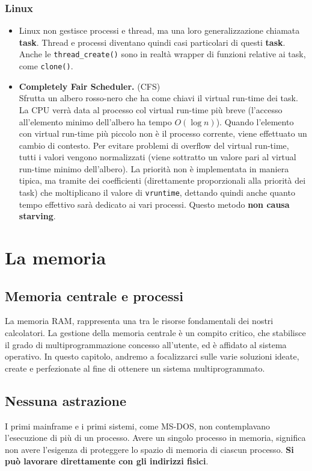 \documentclass{report}
\begin{document}
\subsection{Linux}
\begin{itemize}
    \item Linux non gestisce processi e thread, ma una loro generalizzazione chiamata \textbf{task}. Thread e processi diventano quindi casi particolari di questi \textbf{task}. Anche le \verb|thread_create()| sono in realtà wrapper di funzioni relative ai task, come \verb|clone()|.
    
    \item \textbf{Completely Fair Scheduler.} (CFS)\\
    Sfrutta un albero rosso-nero che ha come chiavi il virtual run-time dei task. La CPU verrà data al processo col virtual run-time più breve (l'accesso all'elemento minimo dell'albero ha tempo $O(\log n)$). Quando l'elemento con virtual run-time più piccolo non è il processo corrente, viene effettuato un cambio di contesto. Per evitare problemi di overflow del virtual run-time, tutti i valori vengono normalizzati (viene sottratto un valore pari al virtual run-time minimo dell'albero).
    La priorità non è implementata in maniera tipica, ma tramite dei coefficienti (direttamente proporzionali alla priorità dei task) che moltiplicano il valore di \verb|vruntime|, dettando quindi anche quanto tempo effettivo sarà dedicato ai vari processi. Questo metodo \textbf{non causa starving}.
\end{itemize}

\chapter{La memoria}

\section{Memoria centrale e processi}
La memoria RAM, rappresenta una tra le risorse fondamentali dei nostri calcolatori. La gestione della memoria centrale è un compito critico, che stabilisce il grado di multiprogrammazione concesso all'utente, ed è affidato al sistema operativo.
In questo capitolo, andremo a focalizzarci sulle varie soluzioni ideate, create e perfezionate al fine di ottenere un sistema multiprogrammato.

\section{Nessuna astrazione}
I primi mainframe e i primi sistemi, come MS-DOS, non contemplavano l'esecuzione di più di un processo. Avere un singolo processo in memoria, significa non avere l'esigenza di proteggere lo spazio di memoria di ciascun processo. \textbf{Si può lavorare direttamente con gli indirizzi fisici}.
\end{document}
